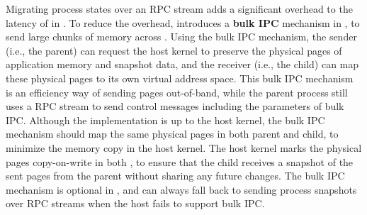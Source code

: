 




Migrating process states over an RPC stream adds a significant overhead to the latency of  in \thelibos{}.
To reduce the overhead, \graphene{} introduces a {\bf bulk IPC} mechanism in \thehostabi{}, to send large chunks of memory across \picoprocs{}. 
Using the bulk IPC mechanism, 
the sender (i.e., the parent) can request the host kernel
to preserve the physical pages of application memory and snapshot data,
and the receiver (i.e., the child) can map these physical pages to its own virtual address space.
This bulk IPC mechanism is an efficiency way of sending pages out-of-band,
while the parent process still uses a RPC stream
to send control messages including the parameters of bulk IPC.
Although the implementation is up to the host kernel,
the bulk IPC mechanism should map the same physical pages in both parent and child,
to minimize the memory copy in the host kernel.
The host kernel marks the physical pages copy-on-write in both \picoprocs{},
to ensure that the child receives a snapshot of the sent pages from the parent without sharing any future changes.
The bulk IPC mechanism is optional in \thehostabi{},
and \thelibos{} can always fall back to sending process snapshots over RPC streams
when the host fails to support bulk IPC.




